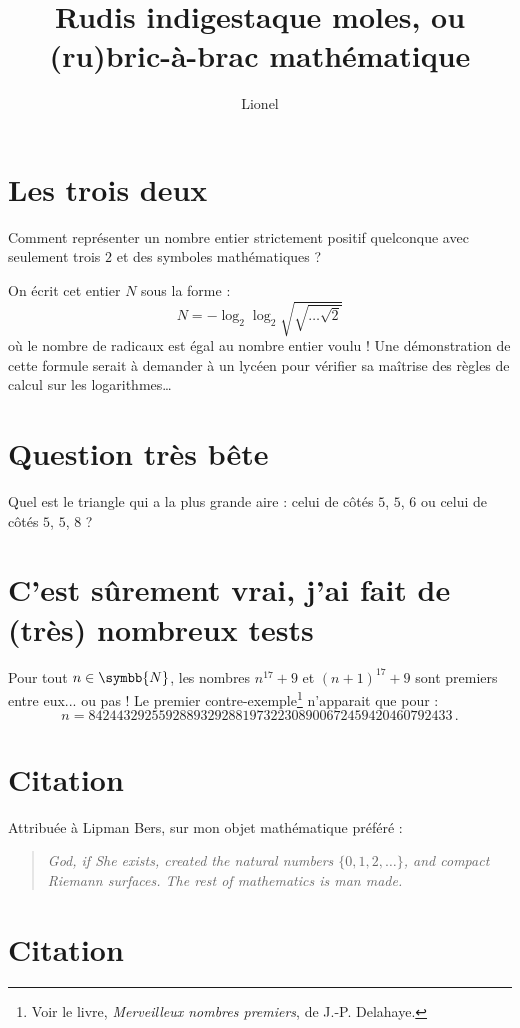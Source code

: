 \documentclass[a4paper,11pt]{article}
\title{Rudis indigestaque moles, ou (ru)bric-à-brac mathématique}
\author{Lionel \bsc{V\kern-1pt idal}}
\newcommand{\N}{\ensuremath{\symbb{N}}\xspace}
\begin{document}
\maketitle

\section{Les trois deux}

Comment représenter un nombre entier strictement positif quelconque avec
seulement trois $2$ et des symboles mathématiques ?

On écrit cet entier $N$ sous la forme :
\[ N = -\log_2 \log_2 \sqrt{\sqrt{\ldots\sqrt{2}}} \]
où le nombre de radicaux est égal au nombre entier voulu ! Une démonstration
de cette formule serait à demander à un lycéen pour vérifier sa maîtrise des
règles de calcul sur les logarithmes\dots

\section{Question très bête}

Quel est le triangle qui a la plus grande aire : celui de côtés $5$, $5$,
$6$ ou celui de côtés $5$, $5$, $8$ ?

\section{C'est sûrement vrai, j'ai fait de (très) nombreux tests}

Pour tout $n\in\N$, les nombres $n^{17}+9$ et $(n+1)^{17}+9$ sont premiers
entre eux... ou pas !
Le premier contre-exemple\footnote{
  Voir le livre, {\slshape Merveilleux nombres premiers}, de J.-P. Delahaye.}
n'apparait que pour :
\[ n = 8424432925592889329288197322308900672459420460792433\,. \]

\section{Citation}

Attribuée à Lipman Bers, sur mon objet mathématique préféré :
\begin{quotation}\itshape\noindent
  God, if She exists, created the natural numbers $\{0,1,2,\ldots\}$,
  and compact Riemann surfaces. The rest of mathematics is man made.
\end{quotation}

\section{Citation}
\end{document}

